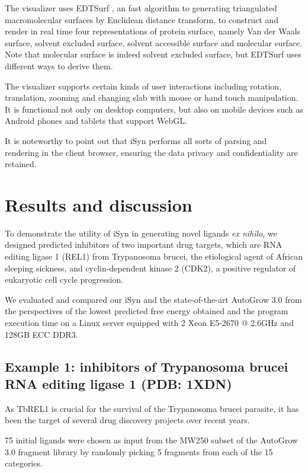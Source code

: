 The visualizer uses EDTSurf \citep{1297,1350}, an fast algorithm to generating triangulated macromolecular surfaces by Euclidean distance transform, to construct and render in real time four representations of protein surface, namely Van der Waals surface, solvent excluded surface, solvent accessible surface and molecular surface. Note that molecular surface is indeed solvent excluded surface, but EDTSurf uses different ways to derive them.

The visualizer supports certain kinds of user interactions including rotation, translation, zooming and changing slab with mouse or hand touch manipulation. It is functional not only on desktop computers, but also on mobile devices such as Android phones and tablets that support WebGL.

It is noteworthy to point out that iSyn performs all sorts of parsing and rendering in the client browser, ensuring the data privacy and confidentiality are retained.

\section{Results and discussion}

To demonstrate the utility of iSyn in generating novel ligands \textit{ex nihilo}, we designed predicted inhibitors of two important drug targets, which are RNA editing ligase 1 (REL1) from Trypanosoma brucei, the etiological agent of African sleeping sickness, and cyclin-dependent kinase 2 (CDK2), a positive regulator of eukaryotic cell cycle progression.

We evaluated and compared our iSyn and the state-of-the-art AutoGrow 3.0 from the perspectives of the lowest predicted free energy obtained and the program execution time on a Linux server equipped with 2 Xeon E5-2670 @ 2.6GHz and 128GB ECC DDR3.

\subsection{Example 1: inhibitors of Trypanosoma brucei RNA editing ligase 1 (PDB: 1XDN)}

As TbREL1 is crucial for the survival of the Trypanosoma brucei parasite, it has been the target of several drug discovery projects over recent years.

75 initial ligands were chosen as input from the MW250 subset of the AutoGrow 3.0 fragment library by randomly picking 5 fragments from each of the 15 categories.

